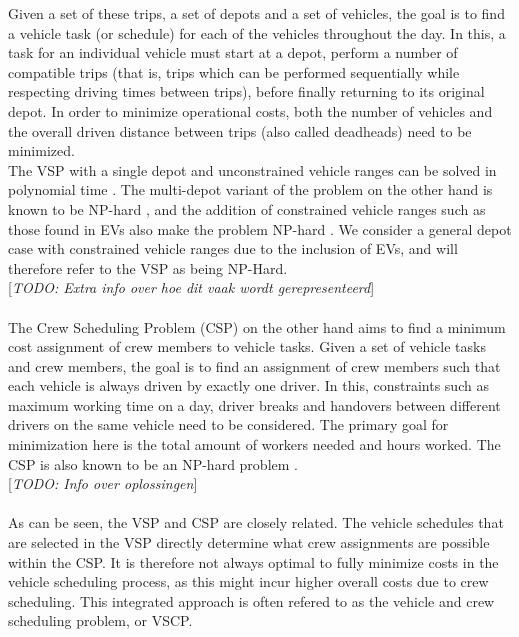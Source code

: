 \documentclass[ht]{article}
\newcommand{\todo}[1]{{\color{red}[\textit{TODO: #1}]}}
\begin{document}
Given a set of these trips, a set of depots and a set of vehicles, the goal is to find a vehicle task (or schedule) for each of the vehicles throughout the day. In this, a task for an individual vehicle must start at a depot, perform a number of compatible trips (that is, trips which can be performed sequentially while respecting driving times between trips), before finally returning to its original depot. In order to minimize operational costs, both the number of vehicles and the overall driven distance between trips (also called deadheads) need to be minimized. \\
The VSP with a single depot and unconstrained vehicle ranges can be solved in polynomial time \cite{Freling2003SDVSP}. The multi-depot variant of the problem on the other hand is known to be NP-hard \cite{Bodin1983, Bertossi1987, Even1975}, and the addition of constrained vehicle ranges such as those found in EVs also make the problem NP-hard \cite{Bodin1983, Sassi2014}. We consider a general depot case with constrained vehicle ranges due to the inclusion of EVs, and will therefore refer to the VSP as being NP-Hard. \\ 
\todo{Extra info over hoe dit vaak wordt gerepresenteerd} \\\\
The Crew Scheduling Problem (CSP) on the other hand aims to find a minimum cost assignment of crew members to vehicle tasks. Given a set of vehicle tasks and crew members, the goal is to find an assignment of crew members such that each vehicle is always driven by exactly one driver. In this, constraints such as maximum working time on a day, driver breaks and handovers between different drivers on the same vehicle need to be considered. The primary goal for minimization here is the total amount of workers needed and hours worked. The CSP is also known to be an NP-hard problem \cite{Fischetti1989}.\\
\todo{Info over oplossingen} \\\\
As can be seen, the VSP and CSP are closely related. The vehicle schedules that are selected in the VSP directly determine what crew assignments are possible within the CSP. It is therefore not always optimal to fully minimize costs in the vehicle scheduling process, as this might incur higher overall costs due to crew scheduling. This integrated approach is often refered to as the vehicle and crew scheduling problem, or VSCP. \\\\
\end{document}
